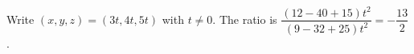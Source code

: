 Write $(x,y,z)=(3t,4t,5t)$ with $t\ne0$. The ratio is $\dfrac{(12-40+15)t^2}{(9-32+25)t^2}=\boxed{-\dfrac{13}{2}}$.
